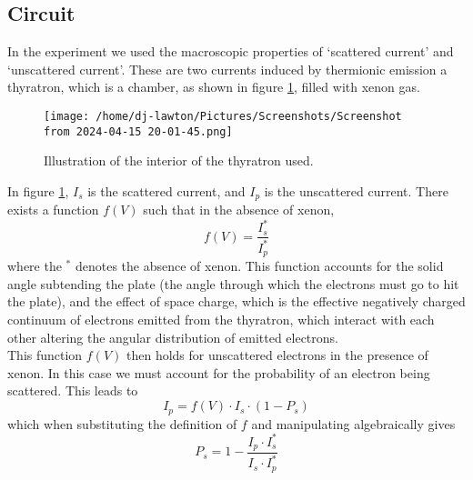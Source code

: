 \documentclass{article}
\begin{document}
\subsection{Circuit}
In the experiment we used the macroscopic properties of `scattered current' and `unscattered current'. These are two currents induced by thermionic emission a thyratron, which is a chamber, as shown in figure \ref{fig: thyratron}, filled with xenon gas.
\begin{figure}[H]
\begin{center}
\texttt{[image: /home/dj-lawton/Pictures/Screenshots/Screenshot from 2024-04-15 20-01-45.png]}
\caption{\label{fig: thyratron}Illustration of the interior of the thyratron used.}
\end{center}
\end{figure}
In figure \ref{fig: thyratron}, $I_s$ is the scattered current, and $I_p$ is the unscattered current. There exists a function $f(V)$ such that in the absence of xenon,
\begin{equation}
f(V) = \frac{I^*_s}{I^*_p}
\end{equation}
where the $^*$ denotes the absence of xenon. This function accounts for the solid angle subtending the plate (the angle through which the electrons must go to hit the plate), and the effect of space charge, which is the effective negatively charged continuum of electrons emitted from the thyratron, which interact with each other altering the angular distribution of emitted electrons.\\
\indent This function $f(V)$ then holds for unscattered electrons in the presence of xenon. In this case we must account for the probability of an electron being scattered. This leads to
\begin{equation}
I_p = f(V)\cdot I_s \cdot (1-P_s)
\end{equation}
which when substituting the definition of $f$ and manipulating algebraically gives
\begin{equation}
P_s= 1 - \frac{I_p\cdot I^*_s}{I_s\cdot I^*_p}
\label{eq: prob}
\end{equation}
\end{document}
